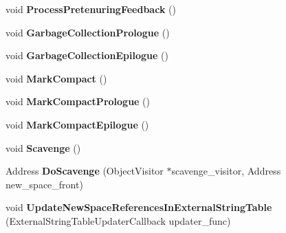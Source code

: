 \begin{DoxyCompactItemize}
\item 
void {\bfseries Process\+Pretenuring\+Feedback} ()\hypertarget{classv8_1_1internal_1_1_heap_a38bda2caad522bbd149cd08f224224a6}{}\label{classv8_1_1internal_1_1_heap_a38bda2caad522bbd149cd08f224224a6}

\item 
void {\bfseries Garbage\+Collection\+Prologue} ()\hypertarget{classv8_1_1internal_1_1_heap_a62ef7f0b99fd142eed6d3ee4c894613d}{}\label{classv8_1_1internal_1_1_heap_a62ef7f0b99fd142eed6d3ee4c894613d}

\item 
void {\bfseries Garbage\+Collection\+Epilogue} ()\hypertarget{classv8_1_1internal_1_1_heap_a3fb53ca7fe502b725dffef370b406f45}{}\label{classv8_1_1internal_1_1_heap_a3fb53ca7fe502b725dffef370b406f45}

\item 
void {\bfseries Mark\+Compact} ()\hypertarget{classv8_1_1internal_1_1_heap_a4b71bdd43a2cf21d739343ad21b323af}{}\label{classv8_1_1internal_1_1_heap_a4b71bdd43a2cf21d739343ad21b323af}

\item 
void {\bfseries Mark\+Compact\+Prologue} ()\hypertarget{classv8_1_1internal_1_1_heap_a2eece3a9dff9ac7fecd5fd9b8dd49556}{}\label{classv8_1_1internal_1_1_heap_a2eece3a9dff9ac7fecd5fd9b8dd49556}

\item 
void {\bfseries Mark\+Compact\+Epilogue} ()\hypertarget{classv8_1_1internal_1_1_heap_a61ecd8faee37c7d189d2c6f669625b1e}{}\label{classv8_1_1internal_1_1_heap_a61ecd8faee37c7d189d2c6f669625b1e}

\item 
void {\bfseries Scavenge} ()\hypertarget{classv8_1_1internal_1_1_heap_a24ba000e8c692624e81cd93dcdbe7ccd}{}\label{classv8_1_1internal_1_1_heap_a24ba000e8c692624e81cd93dcdbe7ccd}

\item 
Address {\bfseries Do\+Scavenge} (Object\+Visitor $\ast$scavenge\+\_\+visitor, Address new\+\_\+space\+\_\+front)\hypertarget{classv8_1_1internal_1_1_heap_a395127399e8a8bd529fc4b7ba87577c2}{}\label{classv8_1_1internal_1_1_heap_a395127399e8a8bd529fc4b7ba87577c2}

\item 
void {\bfseries Update\+New\+Space\+References\+In\+External\+String\+Table} (External\+String\+Table\+Updater\+Callback updater\+\_\+func)\hypertarget{classv8_1_1internal_1_1_heap_a9478f5c950fce134ad9a3e8dc2dad254}{}\label{classv8_1_1internal_1_1_heap_a9478f5c950fce134ad9a3e8dc2dad254}


\end{DoxyCompactItemize}
